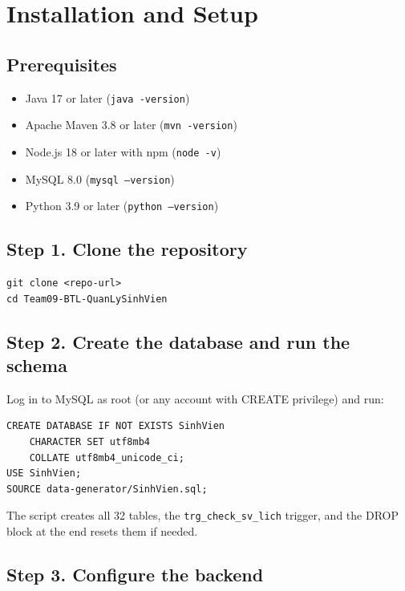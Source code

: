 \documentclass[12pt,a4paper]{report}
\begin{document}
\section{Installation and Setup}

\subsection*{Prerequisites}

\begin{itemize}
  \item Java 17 or later (\texttt{java -version})
  \item Apache Maven 3.8 or later (\texttt{mvn -version})
  \item Node.js 18 or later with npm (\texttt{node -v})
  \item MySQL 8.0 (\texttt{mysql --version})
  \item Python 3.9 or later (\texttt{python --version})
\end{itemize}

\subsection*{Step 1. Clone the repository}

\begin{verbatim}
git clone <repo-url>
cd Team09-BTL-QuanLySinhVien
\end{verbatim}

\subsection*{Step 2. Create the database and run the schema}

Log in to MySQL as root (or any account with CREATE privilege) and run:

\begin{verbatim}
CREATE DATABASE IF NOT EXISTS SinhVien
    CHARACTER SET utf8mb4
    COLLATE utf8mb4_unicode_ci;
USE SinhVien;
SOURCE data-generator/SinhVien.sql;
\end{verbatim}

The script creates all 32 tables, the \texttt{trg\_check\_sv\_lich} trigger, and the DROP block at the end resets them if needed.

\subsection*{Step 3. Configure the backend}
\end{document}
